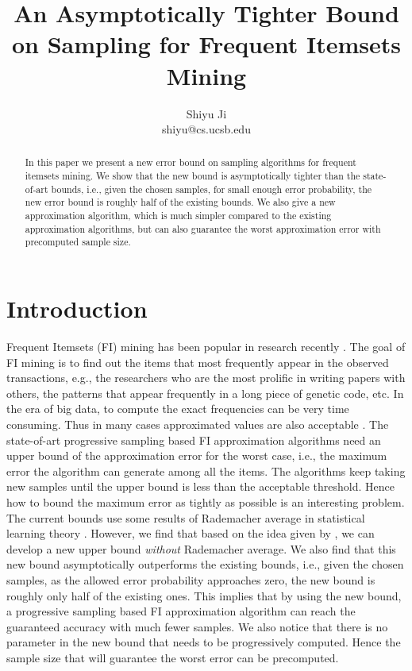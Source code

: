 \documentclass{article}
\begin{document}
\title{\Large\bf An Asymptotically Tighter Bound on Sampling for Frequent Itemsets Mining}
\author{Shiyu Ji\\ shiyu@cs.ucsb.edu}
\date{}
\maketitle

\newtheorem{definition}{Definition}
\theoremstyle{definition}
\newtheorem{theorem}{Theorem}
\theoremstyle{plain}
\newtheorem{lemma}{Lemma}
\theoremstyle{plain}
\newtheorem{corollary}{Corollary}
\theoremstyle{plain}

\begin{abstract}
In this paper we present a new error bound on sampling algorithms for frequent itemsets mining. We show that the new bound is asymptotically tighter than the state-of-art bounds, i.e., given the chosen samples, for small enough error probability, the new error bound is roughly half of the existing bounds. We also give a new approximation algorithm, which is much simpler compared to the existing approximation algorithms, but can also guarantee the worst approximation error with precomputed sample size.
\end{abstract}

\section{Introduction}
Frequent Itemsets (FI) mining has been popular in research recently \cite{AIS93, HCX07, RU15}. The goal of FI mining is to find out the items that most frequently appear in the observed transactions, e.g., the researchers who are the most prolific in writing papers with others, the patterns that appear frequently in a long piece of genetic code, etc. 
In the era of big data, to compute the exact frequencies can be very time consuming. Thus in many cases approximated values are also acceptable \cite{RU15}.
The state-of-art progressive sampling based FI approximation algorithms \cite{RU15} need an upper bound of the approximation error for the worst case, i.e., the maximum error the algorithm can generate among all the items. The algorithms keep taking new samples until the upper bound is less than the acceptable threshold. Hence how to bound the maximum error as tightly as possible is an interesting problem. The current bounds use some results of Rademacher average in statistical learning theory \cite{Vap98,Vap13,BBL04,BBL05}. 
However, we find that based on the idea given by \cite{BBL04}, we can develop a new upper bound \emph{without} Rademacher average. 
We also find that this new bound asymptotically outperforms the existing bounds, i.e., given the chosen samples, as the allowed error probability approaches zero, the new bound is roughly only half of the existing ones. This implies that by using the new bound, a progressive sampling based FI approximation algorithm can reach the guaranteed accuracy with much fewer samples. We also notice that there is no parameter in the new bound that needs to be progressively computed. Hence the sample size that will guarantee the worst error can be precomputed.
\end{document}
